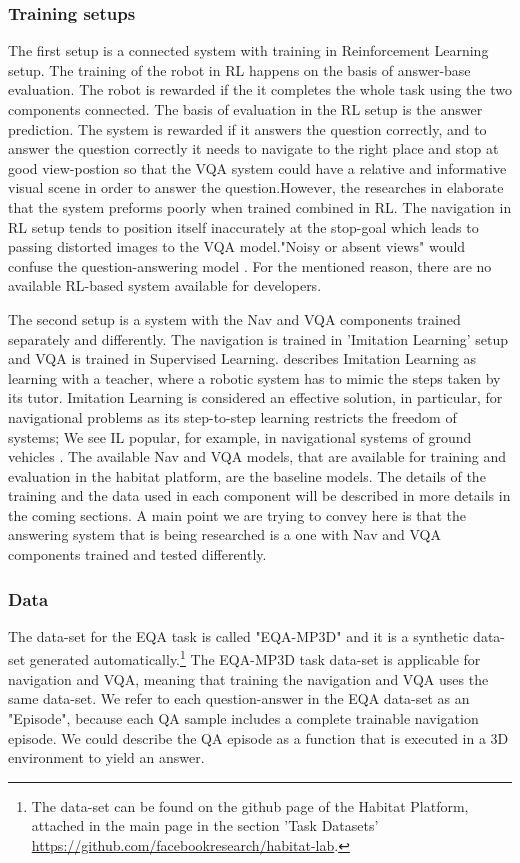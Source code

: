 \subsubsection{Training setups}

The first setup is a connected system with training in Reinforcement Learning setup. The training of the robot in RL happens on the basis of answer-base evaluation. The robot is rewarded if the it completes the whole task using the two components connected.  The basis of evaluation in the RL setup is the answer prediction. The system is rewarded if it answers the question correctly, and to answer the question correctly it needs to navigate to the right place and stop at good view-postion so that the VQA system could have a relative and informative visual scene in order to answer the question.However, the researches in \cite{embodiedqa} elaborate that the system preforms poorly when trained combined in RL. The navigation in RL setup tends to position itself inaccurately at the stop-goal which leads to passing distorted images to the VQA model."Noisy or absent views"  would confuse the question-answering model \cite{embodiedqa}. For the mentioned reason, there are no available RL-based system available for developers. 

The second setup is a system with the Nav and VQA components trained separately and differently. The navigation is trained in 'Imitation Learning' setup and  VQA is trained  in Supervised Learning.\cite{hussein2017imitation} describes Imitation Learning as learning with a teacher, where a robotic system has to mimic the steps taken by its tutor. Imitation Learning is considered an effective solution, in particular, for navigational problems as its step-to-step learning restricts the freedom of systems; We see IL popular, for example, in navigational systems of ground vehicles \cite{silver2008high}. The available Nav and VQA models, that are available for training and evaluation in the habitat platform, are the baseline models.  The details of the training and the data used in each component will be described in more details in the coming sections. A main point we are trying to convey here is that the answering system that is being researched is a one with  Nav and VQA  components trained and tested differently. 

\subsubsection{Data} 

The data-set for the EQA task is called "EQA-MP3D" and it is a synthetic data-set generated automatically.\footnote{The data-set can be found on the github page of the Habitat Platform, attached in the main page in the section 'Task Datasets' \url{https://github.com/facebookresearch/habitat-lab}.}  The EQA-MP3D task data-set is applicable for navigation and VQA, meaning that training the navigation and VQA uses the same data-set.  We refer to each question-answer in the EQA data-set as an "Episode", because each QA sample includes a complete trainable navigation episode. We could describe the QA episode as a function that is executed in a 3D environment to yield an answer. 

